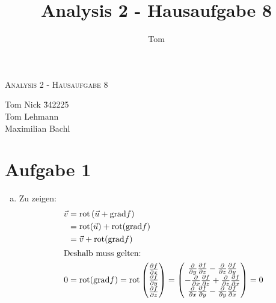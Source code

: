 \documentclass[10pt,a4paper,parskip=half]{scrartcl}
\author{Tom}
\title{Analysis 2 - Hausaufgabe 8}
\newcommand{\vecthree}[3]{\begin{pmatrix}#1\\#2\\#3\\\end {pmatrix}}
\begin{document}
\begin{center}
\textsc{\Large{Analysis 2 - Hausaufgabe 8}} \\
\end{center}
\begin{tabbing}
Tom Nick \hspace{1.4cm}\= 342225\\
Tom Lehmann\\
Maximilian Bachl
\end{tabbing}
\section*{Aufgabe 1}
	\begin{enumerate}[(a)]
\item Zu zeigen:
\begin{align*}
\vec v &= \text{rot} \left(\vec u + \text{grad}f \right)\\
&= \text{rot} (\vec u) + \text{rot}(\text{grad} f) \\
&= \vec v + \text{rot}(\text{grad} f)\\
\intertext{Deshalb muss gelten: }
0 &= \text{rot}(\text{grad}f)= 
\text{rot}\vecthree{\frac{\partial f}{\partial x}}{\frac{\partial f}{\partial y}}{\frac{\partial f}{\partial z}} =
\begin{pmatrix} \frac{\partial}{\partial y}\frac{\partial f}{\partial z} - \frac{\partial}{\partial z}\frac{\partial f}{\partial y} \\ -\frac{\partial}{\partial x}\frac{\partial f}{\partial z} + \frac{\partial}{\partial z}\frac{\partial f}{\partial x} \\ \frac{\partial}{\partial x}\frac{\partial f}{\partial y} - \frac{\partial}{\partial y}\frac{\partial f}{\partial x}
\end{pmatrix} = 0
\end{align*}


\end{enumerate}
\end{document}
